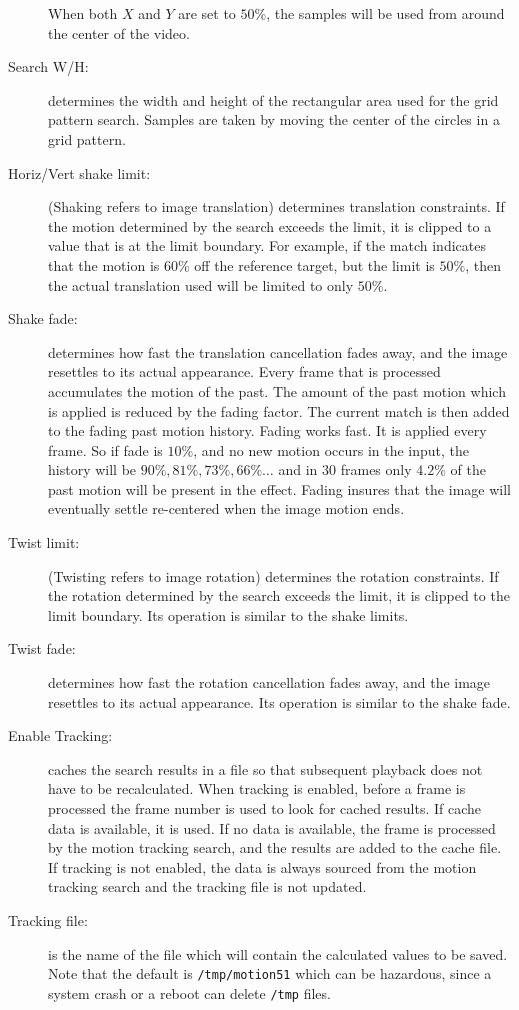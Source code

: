 \begin{description}
    When both $X$ and $Y$ are set to $50\%$, the samples will be used from around the center of the video.
    \item[Search W/H:] determines the width and height of the rectangular area used for the grid pattern search. Samples are taken by moving the center of the circles in a grid pattern.
    \item[Horiz/Vert shake limit:] (Shaking refers to image translation) determines translation constraints. If the motion determined by the search exceeds the limit, it is clipped to a value that is at the limit boundary. For example, if the match indicates that the motion is $60\%$ off the reference target, but the limit is $50\%$, then the actual translation used will be limited to only $50\%$.
    \item[Shake fade:] determines how fast the translation cancellation fades away, and the image resettles to its actual appearance. Every frame that is processed accumulates the motion of the past. The amount of the past motion which is applied is reduced by the fading factor. The current match is then added to the fading past motion history. Fading works fast. It is applied every frame. So if fade is $10\%$, and no new motion occurs in the input, the history will be $90\%, 81\%, 73\%, 66\%\dots$ and in $30$ frames only $4.2\%$ of the past motion will be present in the effect. Fading insures that the image will eventually settle re-centered when the image motion ends.
    \item[Twist limit:] (Twisting refers to image rotation) determines the rotation constraints. If the rotation determined by the search exceeds the limit, it is clipped to the limit boundary. Its operation is similar to the shake limits.
    \item[Twist fade:] determines how fast the rotation cancellation fades away, and the image resettles to its actual appearance. Its operation is similar to the shake fade.
    \item[Enable Tracking:] caches the search results in a file so that subsequent playback does not have to be recalculated. When tracking is enabled, before a frame is processed the frame number is used to look for cached results. If cache data is available, it is used. If no data is available, the frame is processed by the motion tracking search, and the results are added to the cache file. If tracking is not enabled, the data is always sourced from the motion tracking search and the tracking file is not updated.
    \item[Tracking file:] is the name of the file which will contain the calculated values to be saved. Note that the default is \texttt{/tmp/motion51} which can be hazardous, since a system crash or a reboot can delete \texttt{/tmp} files.

\end{description}
